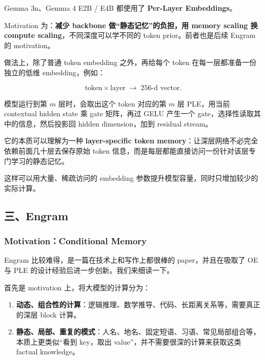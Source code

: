 \documentclass[
  11pt,
  a4paper,
  fontset=none]{ctexart}
\newenvironment{NotesFormula}{%
  \par\noindent\begin{minipage}{\linewidth}%
  \setlength{\parindent}{2em}%
  \setlength{\parskip}{0.35em}%
}{\end{minipage}\par}
\begin{document}
Gemma 3n、Gemma 4 E2B / E4B 都使用了 \textbf{Per-Layer Embeddings}。

Motivation 为：\textbf{减少 backbone 做``静态记忆''的负担，用 memory
scaling 换 compute scaling}，不同深度可以学不同的 token
prior。前者也是后续 Engram 的 motivation。

\begin{NotesFormula}

做法上，除了普通 token embedding 之外，再给每个 token
在每一层都准备一份独立的低维 embedding，例如：

\[
\text{token}\times\text{layer}\;\longrightarrow\;\text{256-d vector}.
\]

\end{NotesFormula}

模型运行到第 \(m\) 层时，会取出这个 token 对应的第 \(m\) 层 PLE，用当前
contextual hidden state 乘 gate 矩阵，再过 GELU 产生一个
gate，选择性读取其中的信息，然后投影回 hidden dimension，加到 residual
stream。

它的本质可以理解为一种 \textbf{layer-specific token
memory}：让深层网络不必完全依赖前面几十层去保存原始 token
信息，而是每层都能直接访问一份针对该层专门学习的静态记忆。

这样可以用大量、稀疏访问的 embedding
参数提升模型容量，同时只增加较少的实际计算。

\subsection{三、Engram}\label{ux4e09engram}

\subsubsection{Motivation：Conditional
Memory}\label{motivationconditional-memory}

Engram 比较难得，是一篇在技术上和写作上都很棒的 paper，并且在吸取了 OE
与 PLE 的设计经验后进一步创新。我们来细读一下。

首先是 motivation 上，将大模型的计算分为：

\begin{enumerate}
\def\labelenumi{\arabic{enumi}.}
\item
  \textbf{动态、组合性的计算}：逻辑推理、数学推导、代码、长距离关系等，需要真正的深层
  block 计算。
\item
  \textbf{静态、局部、重复的模式}：人名、地名、固定短语、习语、常见局部组合等，本质上更类似``看到
  key，取出 value''，并不需要很深的计算来获取这类 factual knowledge。
\end{enumerate}
\end{document}
